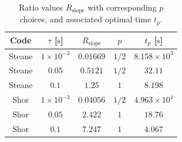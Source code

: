 \begin{table}[h]
        \centering
        \caption{Ratio values
        $R_{\mathrm{slope}}$ with corresponding $p$ choices, and associated
        optimal time $t_p$.}
        \label{tab:scale-regimes}
        \begin{tabular}{|c|c|c|c|c|}
            \hline
            Code & $\tau$ [$\mathrm{s}$] & $R_{\mathrm{slope}}$ & $p$ & $t_p$ [$\mathrm{s}$] \\
            \hline
            Steane & $1\times10^{-3}$ & $0.01669$ & $1/2$ & $8.158\times10^{3}$ \\
        Steane & $0.05$ & $0.5121$ & $1/2$ & $32.11$ \\
        Steane & $0.1$ & $1.25$ & $1$ & $8.198$ \\
        Shor & $1\times10^{-3}$ & $0.04056$ & $1/2$ & $4.963\times10^{4}$ \\
        Shor & $0.05$ & $2.422$ & $1$ & $18.76$ \\
        Shor & $0.1$ & $7.247$ & $1$ & $4.067$ \\
            \hline
        \end{tabular}
    \end{table}
    